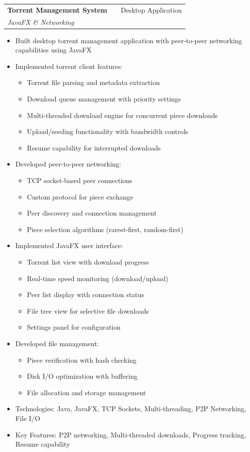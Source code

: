 \documentclass[a4paper,12pt]{article}
\makeatletter
\newenvironment{projectdetailed}[3]
    {
    \begin{tabularx}{\linewidth}{@{}l X r@{}}
    \textbf{#1} & \hfill & #2 \\
    \textit{#3} & & \\[3.75pt]
    \end{tabularx}
    \begin{minipage}[t]{\linewidth}
    \begin{itemize}[nosep,after=\strut, leftmargin=1em, itemsep=2pt,label=--]
    }
    {
    \end{itemize}
    \end{minipage}
    \vspace{6pt}
    }
\makeatother
\begin{document}
\begin{projectdetailed}{Torrent Management System}{Desktop Application}{JavaFX \& Networking}
\item Built desktop torrent management application with peer-to-peer networking capabilities using JavaFX
\item Implemented torrent client features:
\begin{itemize}[nosep, leftmargin=2em]
    \item Torrent file parsing and metadata extraction
    \item Download queue management with priority settings
    \item Multi-threaded download engine for concurrent piece downloads
    \item Upload/seeding functionality with bandwidth controls
    \item Resume capability for interrupted downloads
\end{itemize}
\item Developed peer-to-peer networking:
\begin{itemize}[nosep, leftmargin=2em]
    \item TCP socket-based peer connections
    \item Custom protocol for piece exchange
    \item Peer discovery and connection management
    \item Piece selection algorithms (rarest-first, random-first)
\end{itemize}
\item Implemented JavaFX user interface:
\begin{itemize}[nosep, leftmargin=2em]
    \item Torrent list view with download progress
    \item Real-time speed monitoring (download/upload)
    \item Peer list display with connection status
    \item File tree view for selective file downloads
    \item Settings panel for configuration
\end{itemize}
\item Developed file management:
\begin{itemize}[nosep, leftmargin=2em]
    \item Piece verification with hash checking
    \item Disk I/O optimization with buffering
    \item File allocation and storage management
\end{itemize}
\item Technologies: Java, JavaFX, TCP Sockets, Multi-threading, P2P Networking, File I/O
\item Key Features: P2P networking, Multi-threaded downloads, Progress tracking, Resume capability
\end{projectdetailed}
\end{document}
